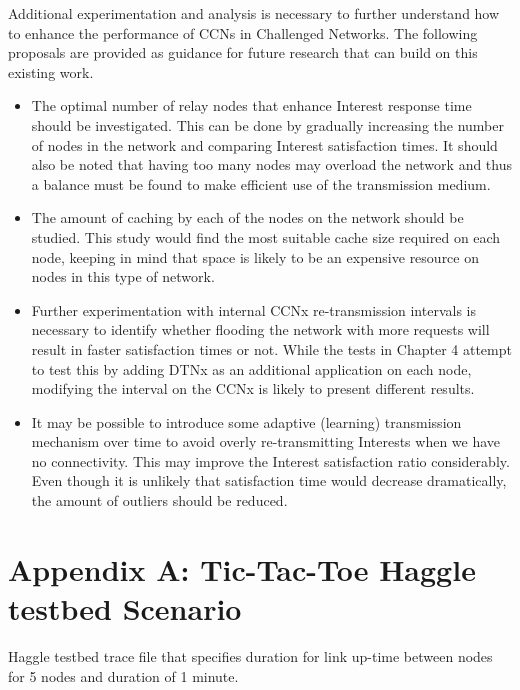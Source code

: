\documentclass[a4paper,12pt]{report}      %
\begin{document}
Additional experimentation and analysis is necessary to further understand how to enhance the performance of CCNs in Challenged Networks. The following proposals are provided as guidance for future research that can build on this existing work.

\begin{itemize}
\item The optimal number of relay nodes that enhance Interest response time should be investigated. This can be done by gradually increasing the number of nodes in the network and comparing Interest satisfaction times. It should also be noted that having too many nodes may overload the network and thus a balance must be found to make efficient use of the transmission medium.

\item The amount of caching by each of the nodes on the network should be studied. This study would find the most suitable cache size required on each node, keeping in mind that space is likely to be an expensive resource on nodes in this type of network.

\item Further experimentation with internal CCNx re-transmission intervals is necessary to identify whether flooding the network with more requests will result in faster satisfaction times or not. While the tests in Chapter 4 attempt to test this by adding DTNx as an additional application on each node, modifying the interval on the CCNx is likely to present different results.

\item It may be possible to introduce some adaptive (learning) transmission mechanism over time to avoid
overly re-transmitting Interests when we have no connectivity. This may improve the Interest satisfaction ratio considerably. Even though it is unlikely that satisfaction time would decrease dramatically, the amount of outliers should be reduced.

\end{itemize}

\pagebreak
{}


\pagebreak
\chapter*{Appendix A: Tic-Tac-Toe Haggle testbed Scenario}

Haggle testbed trace file that specifies duration for link up-time between nodes for 5 nodes and
duration of 1 minute.
\end{document}

